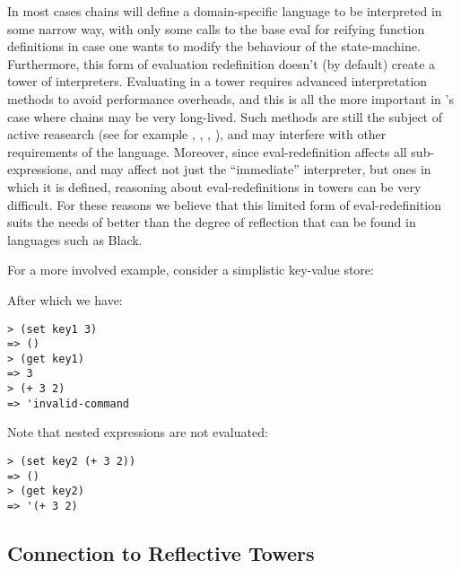 In most cases chains will define a domain-specific language to be interpreted in
some narrow way, with only some calls to the base eval for reifying function
definitions in case one wants to modify the behaviour of the state-machine.
Furthermore, this form of evaluation redefinition doesn't (by default)
create a tower of interpreters. Evaluating in a tower requires advanced
interpretation methods to avoid performance overheads, and this is all
the more important in \rad{}'s case where chains may be very long-lived. Such
methods are still the subject of active reasearch (see for example \cite{Asai2014},
\cite{Thyer1999}, \cite{Amin2017}, \cite{Brown2017}), and may interfere with other
requirements of the language. Moreover, since eval-redefinition affects all
sub-expressions, and may affect not just the ``immediate'' interpreter, but ones
in which it is defined, reasoning about eval-redefinitions in towers can be
very difficult.
For these reasons we believe that this limited
form of eval-redefinition suits the needs of \rad{} better than the degree of
reflection that can be found in languages such as Black.




For a more involved example, consider a simplistic key-value store:

After which we have:
\bigskip
\begin{Verbatim}
> (set key1 3)
=> ()
> (get key1)
=> 3
> (+ 3 2)
=> 'invalid-command
\end{Verbatim}
Note that nested expressions are not evaluated:
\medskip
\begin{Verbatim}
> (set key2 (+ 3 2))
=> ()
> (get key2)
=> '(+ 3 2)
\end{Verbatim}

\subsection{Connection to Reflective Towers}
\label{s:reflective-towers}

